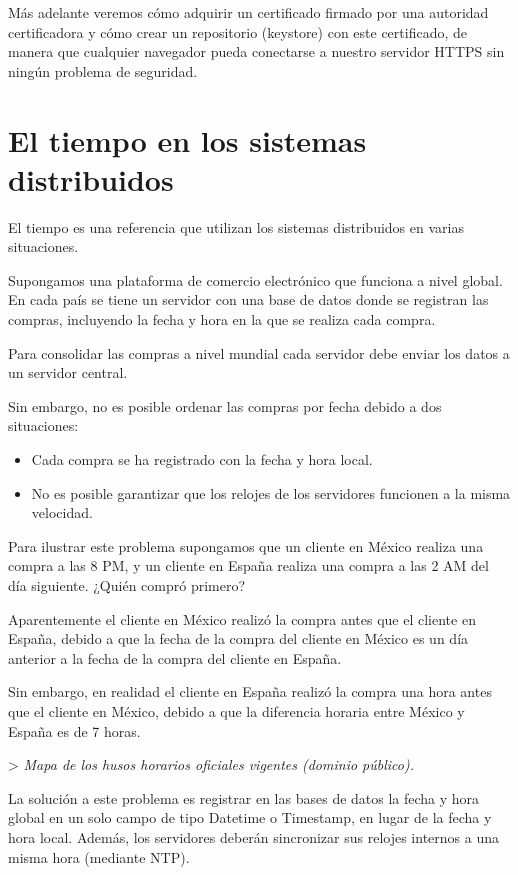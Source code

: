 Más adelante veremos cómo adquirir un certificado firmado por una autoridad certificadora y cómo crear un repositorio (keystore) con este certificado, de manera que cualquier navegador pueda conectarse a nuestro servidor HTTPS sin ningún problema de seguridad.

\chapter{El tiempo en los sistemas distribuidos}

El tiempo es una referencia que utilizan los sistemas distribuidos en varias situaciones.

Supongamos una plataforma de comercio electrónico que funciona a nivel global. En cada país se tiene un servidor con una base de datos donde se registran las compras, incluyendo la fecha y hora en la que se realiza cada compra.

Para consolidar las compras a nivel mundial cada servidor debe enviar los datos a un servidor central.

Sin embargo, no es posible ordenar las compras por fecha debido a dos situaciones:

\begin{itemize}

\item Cada compra se ha registrado con la fecha y hora local.

\item No es posible garantizar que los relojes de los servidores funcionen a la misma velocidad.

\end{itemize}

Para ilustrar este problema supongamos que un cliente en México realiza una compra a las 8 PM, y un cliente en España realiza una compra a las 2 AM del día siguiente. ¿Quién compró primero?

Aparentemente el cliente en México realizó la compra antes que el cliente en España, debido a que la fecha de la compra del cliente en México es un día anterior a la fecha de la compra del cliente en España.

Sin embargo, en realidad el cliente en España realizó la compra una hora antes que el cliente en México, debido a que la diferencia horaria entre México y España es de 7 horas.

> \emph{Mapa de los husos horarios oficiales vigentes (dominio público).} 

La solución a este problema es registrar en las bases de datos la fecha y hora global en un solo campo de tipo Datetime o Timestamp, en lugar de la fecha y hora local. Además, los servidores deberán sincronizar sus relojes internos a una misma hora (mediante NTP).

